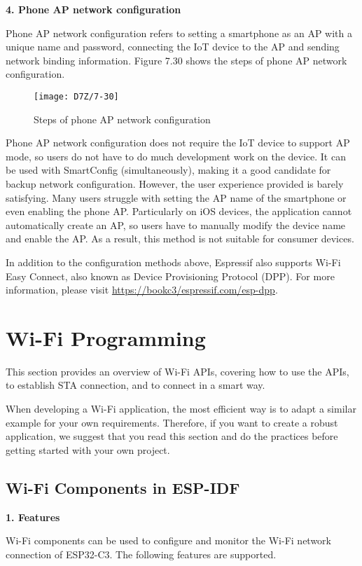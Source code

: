 \documentclass[a4paper,12pt]{book}
\begin{document}
\textbf{4. Phone AP network configuration}

Phone AP network configuration refers to setting a smartphone as an AP with a unique name and password, connecting the IoT device to the AP and sending network binding information. Figure 7.30 shows the steps of phone AP network configuration.

\begin{figure}[!h]
    \centering
    \texttt{[image: D7Z/7-30]}
    \caption{Steps of phone AP network configuration}
\end{figure}

Phone AP network configuration does not require the IoT device to support AP mode, so users do not have to do much development work on the device. It can be used with SmartConfig (simultaneously), making it a good candidate for backup network configuration. However, the user experience provided is barely satisfying. Many users struggle with setting the AP name of the smartphone or even enabling the phone AP. Particularly on iOS devices, the application cannot automatically create an AP, so users have to manually modify the device name and enable the AP. As a result, this method is not suitable for consumer devices.

In addition to the configuration methods above, Espressif also supports Wi-Fi Easy Connect, also known as Device Provisioning Protocol (DPP). For more information, please visit \url{https://bookc3/espressif.com/esp-dpp}.

\section{Wi-Fi Programming}
This section provides an overview of Wi-Fi APIs, covering how to use the APIs, to establish STA connection, and to connect in a smart way.

When developing a Wi-Fi application, the most efficient way is to adapt a similar example for your own requirements. Therefore, if you want to create a robust application, we suggest that you read this section and do the practices before getting started with your own project.

\subsection{Wi-Fi Components in ESP-IDF}
\textbf{1. Features}

Wi-Fi components can be used to configure and monitor the Wi-Fi network connection of ESP32-C3. The following features are supported.
\end{document}
